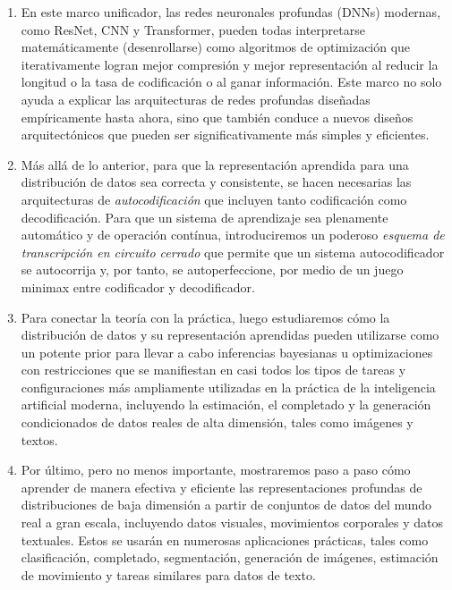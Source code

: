\documentclass[../../book-main.tex]{subfiles}
\begin{document}
\begin{enumerate}
    \item En este marco unificador, las redes neuronales profundas (DNNs) modernas,
        como ResNet, CNN y Transformer, pueden todas 
        interpretarse matemáticamente (desenrollarse) como algoritmos de optimización
        que iterativamente logran mejor compresión
        y mejor representación al reducir la longitud o la tasa de 
        codificación o al ganar información. Este marco no solo ayuda
        a explicar las arquitecturas de redes profundas diseñadas empíricamente
        hasta ahora, sino que también conduce a nuevos
        diseños arquitectónicos que pueden ser significativamente 
        más simples y eficientes.

    \item Más allá de lo anterior, para que la representación
        aprendida para una distribución de datos sea correcta y consistente,
        se hacen necesarias las arquitecturas de {\em autocodificación}
        que incluyen tanto codificación como decodificación. Para que
        un sistema de aprendizaje sea plenamente automático y de operación
        contínua, introduciremos un poderoso {\em esquema de transcripción
        en circuito cerrado} que permite que un sistema autocodificador se
        autocorrija y, por tanto, se autoperfeccione, por medio
        de un juego minimax entre codificador y decodificador.

    \item Para conectar la teoría con la práctica, luego estudiaremos cómo
        la distribución de datos y su representación aprendidas pueden
        utilizarse como un potente prior para llevar a cabo inferencias
        bayesianas u optimizaciones con restricciones que se manifiestan
        en casi todos los tipos de tareas y configuraciones más ampliamente utilizadas en
        la práctica de la inteligencia artificial moderna, incluyendo la 
        estimación, el completado y la generación condicionados de datos
        reales de alta dimensión, tales como imágenes y textos.     

    \item Por último, pero no menos importante, mostraremos paso a paso cómo 
        aprender de manera efectiva y eficiente las representaciones profundas
        de distribuciones de baja dimensión a partir de conjuntos
        de datos del mundo real a gran escala, incluyendo datos visuales, movimientos 
        corporales y datos textuales. Estos se usarán en numerosas aplicaciones
        prácticas, tales como clasificación, completado, segmentación, 
        generación de imágenes, estimación de movimiento y tareas similares
        para datos de texto.
\end{enumerate}
\end{document}
